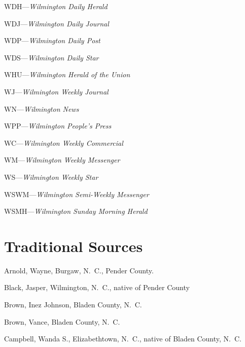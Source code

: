 \documentclass[11pt, a5paper, openright]{book}
\begin{document}
\begin{thebibliography}{99}
  WDH---\emph{Wilmington Daily Herald}

  WDJ---\emph{Wilmington Daily Journal}

  WDP---\emph{Wilmington Daily Post}

  WDS---\emph{Wilmington Daily Star}

  WHU---\emph{Wilmington Herald of the Union}

  WJ---\emph{Wilmington Weekly Journal}

  WN---\emph{Wilmington News}

  WPP---\emph{Wilmington People's Press}

  WC---\emph{Wilmington Weekly Commercial}

  WM---\emph{Wilmington Weekly Messenger}

  WS---\emph{Wilmington Weekly Star}

  WSWM---\emph{Wilmington Semi-Weekly Messenger}

  WSMH---\emph{Wilmington Sunday Morning Herald}

\section*{Traditional Sources}

  Arnold, Wayne, Burgaw, N.~C., Pender County.

  Black, Jasper, Wilmington, N.~C., native of Pender County

  Brown, Inez Johnson, Bladen County, N.~C.

  Brown, Vance, Bladen County, N.~C.

  Campbell, Wanda S., Elizabethtown, N.~C., native of Bladen County, N.~C.


\end{thebibliography}
\end{document}
